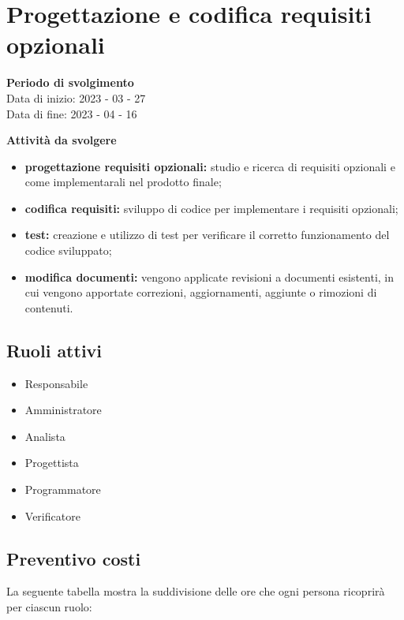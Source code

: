 \section{Progettazione e codifica requisiti opzionali}

\textbf{Periodo di svolgimento}
\\ Data di inizio: 2023 - 03 - 27 \\ Data di fine: 2023 - 04 - 16

\textbf{Attività da svolgere}
    \begin{itemize}
        \item \textbf{progettazione requisiti opzionali:} studio e ricerca di requisiti opzionali e come implementarali nel prodotto finale; 
        \item \textbf{codifica requisiti:} sviluppo di codice per implementare i requisiti opzionali;
        \item \textbf{test:} creazione e utilizzo di test per verificare il corretto funzionamento del codice sviluppato;
        \item \textbf{modifica documenti:} vengono applicate revisioni a documenti esistenti, in cui vengono apportate correzioni, aggiornamenti, aggiunte o rimozioni di contenuti.
    \end{itemize}

\subsection{Ruoli attivi}
\begin{itemize}
    \item Responsabile 
    \item Amministratore 
    \item Analista 
    \item Progettista 
    \item Programmatore 
    \item Verificatore 
\end{itemize}

\subsection{Preventivo costi}

La seguente tabella mostra la suddivisione delle ore che ogni persona ricoprirà per ciascun ruolo:

